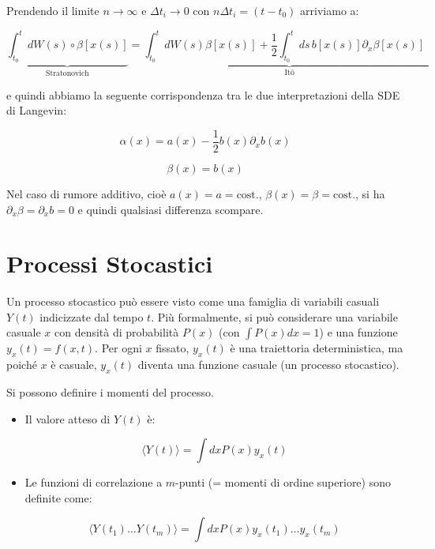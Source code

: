 Prendendo il limite $n \rightarrow \infty$ e $\Delta t_i \rightarrow 0$ con $n\Delta t_i = (t - t_0)$ arriviamo a:


\begin{equation}
\underbrace{ \int_{t_0}^t dW(s) \circ \beta[x(s)]}_{\text{Stratonovich}} = \underbrace{ \int_{t_0}^t dW(s) \beta[x(s)] + \frac{1}{2} \int_{t_0}^t ds \, b[x(s)] \partial_x \beta[x(s)] \quad }_{\text{Itô}}
\end{equation}


e quindi abbiamo la seguente corrispondenza tra le due interpretazioni della SDE di Langevin:


\begin{equation}
\alpha(x) = a(x) - \frac{1}{2} b(x) \partial_x b(x) 
\end{equation}



\begin{equation}
\beta(x) = b(x) 
\end{equation}


Nel caso di rumore additivo, cioè $a(x)=a=\text{cost.}$, $\beta(x)=\beta=\text{cost.}$, si ha $\partial_x \beta = \partial_x b = 0$ e quindi qualsiasi differenza scompare.


\section{Processi Stocastici}

Un processo stocastico può essere visto come una famiglia di variabili casuali $Y(t)$ indicizzate dal tempo $t$. Più formalmente, si può considerare una variabile casuale $x$ con densità di probabilità $P(x)$ (con $\int P(x)dx=1$) e una funzione $y_x(t) = f(x,t)$. Per ogni $x$ fissato, $y_x(t)$ è una traiettoria deterministica, ma poiché $x$ è casuale, $y_x(t)$ diventa una funzione casuale (un processo stocastico).

Si possono definire i momenti del processo.

\begin{itemize}
    \item Il valore atteso di $Y(t)$ è:


\begin{equation}
\langle Y(t) \rangle = \int dx P(x) y_x(t)
\end{equation}


\item Le funzioni di correlazione a $m$-punti (= momenti di ordine superiore) sono definite come:


\begin{equation}
\langle Y(t_1) \dots Y(t_m) \rangle = \int dx P(x) y_x(t_1) \dots y_x(t_m)
\end{equation}
\end{itemize}

